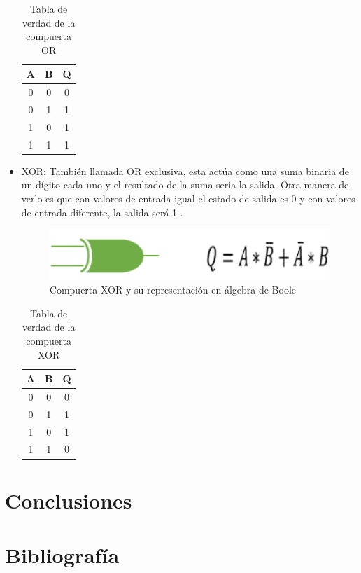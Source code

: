 \documentclass[journal]{IEEEtran}
\begin{document}
\begin{itemize}
		\begin{table}[!htb]
			\centering
			\begin{tabular}{|c|c|c|}
				\hline
				A & B & Q \\
				\hline
				\hline
				0 & 0 & 0 \\
				\hline
				0 & 1 & 1 \\
				\hline
				1 & 0 & 1 \\
				\hline
				1 & 1 & 1 \\
				\hline
			\end{tabular}
			\caption{Tabla de verdad de la compuerta OR}
			\label{tab:OR}
		\end{table}
		
		\item XOR: También llamada OR exclusiva, esta actúa como una suma binaria de un dígito cada uno y el resultado de la suma seria la salida. Otra manera de verlo es que con valores de entrada igual el estado de salida es 0 y con valores de entrada diferente, la salida será 1 \cite{logicbus}.
		
		\begin{figure}[!htb]
			\centering
			\includegraphics[scale = 0.4]{img/XOR.png}
			\caption{Compuerta XOR y su representación en álgebra de Boole \cite{logicbus}}
			\label{fig:XOR}
		\end{figure}
	
		\begin{table}[!htb]
			\centering
			\begin{tabular}{|c|c|c|}
				\hline
				A & B & Q \\
				\hline
				\hline
				0 & 0 & 0 \\
				\hline
				0 & 1 & 1 \\
				\hline
				1 & 0 & 1 \\
				\hline
				1 & 1 & 0 \\
				\hline
			\end{tabular}
			\caption{Tabla de verdad de la compuerta XOR}
			\label{tab:XOR}
		\end{table}
		
	\end{itemize}
	
	
	\section{Conclusiones}
	
	\section{Bibliografía}
	
	
	
	
\end{document}
